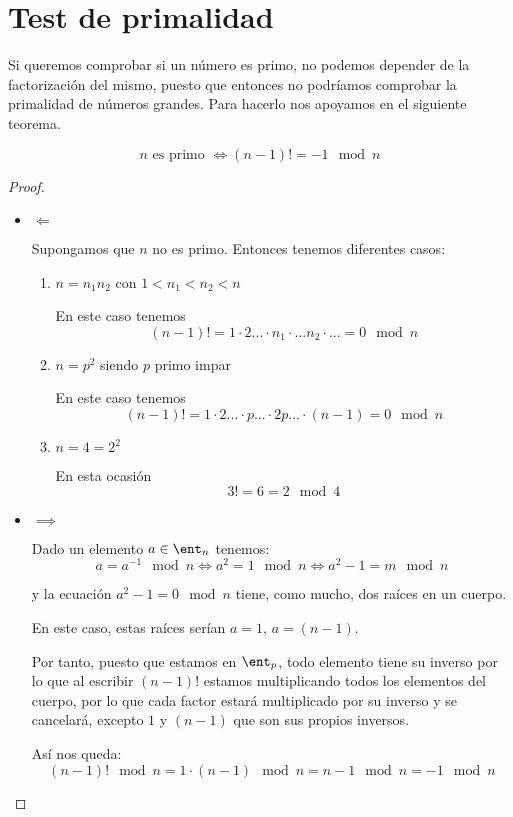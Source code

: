 \section{Test de primalidad}

Si queremos comprobar si un número es primo, no podemos depender de la factorización del mismo, puesto que entonces no podríamos comprobar la primalidad de números grandes. Para hacerlo nos apoyamos en el siguiente teorema.

\begin{theorem}
\[n \text{ es primo } \iff (n-1)! = -1 \mod n\]
\end{theorem}
\begin{proof}
\begin{itemize}
\item $\Longleftarrow$

Supongamos que $n$ no es primo. Entonces tenemos diferentes casos: 
\begin{enumerate}
\item $n=n_1n_2$ con $1<n_1<n_2<n$

En este caso tenemos 
\[(n-1)!=1\cdot 2 ... \cdot n_1 \cdot ... n_2 \cdot ... = 0 \mod n\]

\item $n=p^2$ siendo $p$ primo impar

En este caso tenemos
\[(n-1)! = 1 \cdot 2 ... \cdot p ... \cdot 2p ... \cdot (n-1) = 0 \mod n\]

\item $n=4=2^2$

En esta ocasión
\[3! = 6 = 2 \mod 4\]
\end{enumerate}

\item $\implies$

Dado un elemento $a\in \ent_n$ tenemos:
\[a=a^{-1} \mod n \iff a^2 = 1 \mod n \iff a^2-1 = m \mod n\]

y la ecuación $a^2-1=0\mod n$ tiene, como mucho, dos raíces en un cuerpo. 

En este caso, estas raíces serían $a=1$, $a=(n-1)$.

Por tanto, puesto que estamos en $\ent_p$, todo elemento tiene su inverso por lo que al escribir $(n-1)!$ estamos multiplicando todos los elementos del cuerpo, por lo que cada factor estará multiplicado por su inverso y se cancelará, excepto $1$ y $(n-1)$ que son sus propios inversos.

Así nos queda:
\[(n-1)! \mod n = 1 \cdot (n-1) \mod n = n-1 \mod n = -1 \mod n\]
\end{itemize}
\end{proof}


